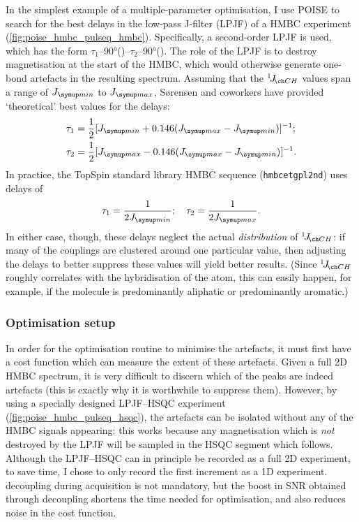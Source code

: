 In the simplest example of a multiple-parameter optimisation, I use POISE to search for the best delays in the low-pass J-filter (LPJF) of a HMBC experiment (\cref{fig:poise_hmbc_pulseq_hmbc}).
Specifically, a second-order LPJF is used, which has the form $\tau_1$--\ang{90}(\carbon{})--$\tau_2$--\ang{90}(\carbon{}).
The role of the LPJF is to destroy  magnetisation at the start of the HMBC, which would otherwise generate one-bond artefacts in the resulting spectrum.
Assuming that the $\oneJ{CH}$ values span a range of $\Jmin$ to $\Jmax$, S{\o}rensen and coworkers have provided `theoretical' best values for the delays:\autocite{Nielsen1986JMR,Meissner2000MRC}
\begin{align}
    \tau_1 &= \frac{1}{2} [\Jmin + 0.146(\Jmax - \Jmin)]^{-1}; \label{eq:hmbc_lpjf_theoretical_min} \\
    \tau_2 &= \frac{1}{2} [\Jmax - 0.146(\Jmax - \Jmin)]^{-1}. \label{eq:hmbc_lpjf_theoretical_max}
\end{align}
In practice, the TopSpin standard library HMBC sequence (\texttt{hmbcetgpl2nd}) uses delays of
\begin{equation}
    \tau_1 = \frac{1}{2\Jmin}; \quad \tau_2 = \frac{1}{2\Jmax}. \label{eq:hmbc_lpjf_bruker}
\end{equation}
In either case, though, these delays neglect the actual \textit{distribution} of $\oneJ{CH}$: if many of the couplings are clustered around one particular value, then adjusting the delays to better suppress these values will yield better results.
(Since $\oneJ{CH}$ roughly correlates with the hybridisation of the \carbon{} atom,\autocite{Krivdin2018PNMRS} this can easily happen, for example, if the molecule is predominantly aliphatic or predominantly aromatic.)


\subsubsection{Optimisation setup}

In order for the optimisation routine to minimise the artefacts, it must first have a cost function which can measure the extent of these artefacts.
Given a full 2D HMBC spectrum, it is very difficult to discern which of the peaks are indeed artefacts (this is exactly why it is worthwhile to suppress them).
However, by using a specially designed LPJF--HSQC experiment (\cref{fig:poise_hmbc_pulseq_hsqc}), the artefacts can be isolated without any of the HMBC signals appearing:
this works because any  magnetisation which is \textit{not} destroyed by the LPJF will be sampled in the HSQC segment which follows.
Although the LPJF--HSQC can in principle be recorded as a full 2D experiment, to save time, I chose to only record the first increment as a 1D experiment.
\carbon{} decoupling during acquisition is not mandatory, but the boost in SNR obtained through decoupling shortens the time needed for optimisation, and also reduces noise in the cost function.

